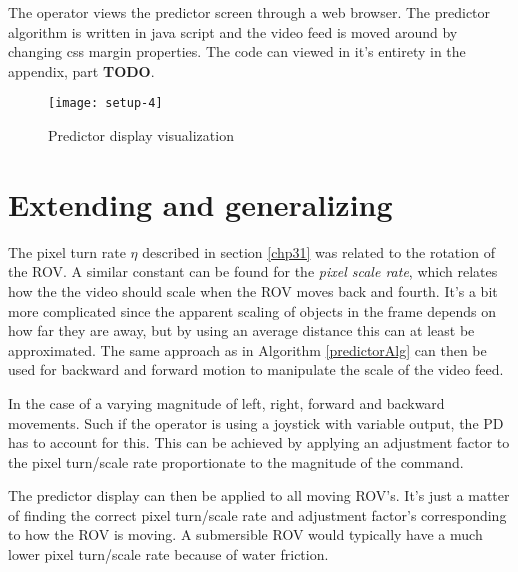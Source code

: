 The operator views the predictor screen through a web browser. The predictor algorithm is written in java script and the video feed is moved around by changing css margin properties. The code can viewed in it's entirety in the appendix, part \textbf{TODO}.

\begin{figure}[h!]
    \centering
    \texttt{[image: setup-4]}
    \caption{Predictor display visualization}
    \label{predictorvis}
\end{figure}

\section{Extending and generalizing}\label{expand}

The pixel turn rate $\eta$ described in section \ref{chp31} was related to the rotation of the ROV. A similar constant can be found for the \emph{pixel scale rate}, which relates how the the video should scale when the ROV moves back and fourth. It's a bit more complicated since the apparent scaling of objects in the frame depends on how far they are away, but by using an average distance this can at least be approximated. The same approach as in Algorithm \ref{predictorAlg} can then be used for backward and forward motion to manipulate the scale of the video feed.

In the case of a varying magnitude of left, right, forward and backward movements. Such if the operator is using a joystick with variable output, the PD has to account for this. This can be achieved by applying an adjustment factor to the pixel turn/scale rate proportionate to the magnitude of the command.

The predictor display can then be applied to all moving ROV's. It's just a matter of finding the correct pixel turn/scale rate and adjustment factor's corresponding to how the ROV is moving. A submersible ROV would typically have a much lower pixel turn/scale rate because of water friction.
